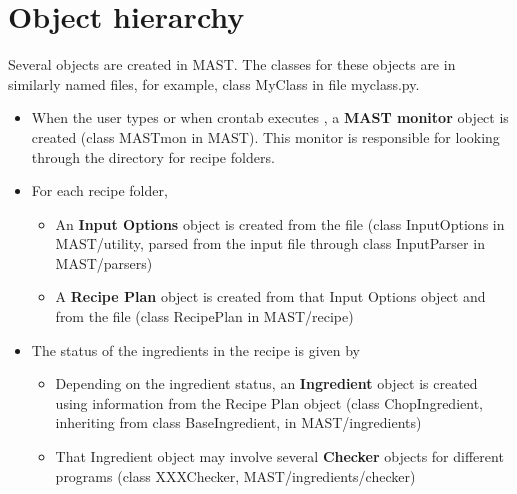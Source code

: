 \documentclass[letterpaper,10pt,english]{sphinxmanual}
\begin{document}
\section{Object hierarchy}
\label{12_0_programming:object-hierarchy}
Several objects are created in MAST. The classes for these objects are in similarly named files, for example, class MyClass in file myclass.py.
\begin{itemize}
\item {} 
When the user types  or when crontab executes , a \textbf{MAST monitor} object is created (class MASTmon in MAST). This monitor is responsible for looking through the  directory for recipe folders.

\item {} 
For each recipe folder,
\begin{itemize}
\item {} 
An \textbf{Input Options} object is created from the  file (class InputOptions in MAST/utility, parsed from the input file through class InputParser in MAST/parsers)

\item {} 
A \textbf{Recipe Plan} object is created from that Input Options object and from the  file (class RecipePlan in MAST/recipe)

\end{itemize}

\item {} 
The status of the ingredients in the recipe is given by 
\begin{itemize}
\item {} 
Depending on the ingredient status, an \textbf{Ingredient} object is created using information from the Recipe Plan object (class ChopIngredient, inheriting from class BaseIngredient, in MAST/ingredients)

\item {} 
That Ingredient object may involve several \textbf{Checker} objects for different programs (class XXXChecker, MAST/ingredients/checker)

\end{itemize}

\end{itemize}
\end{document}
